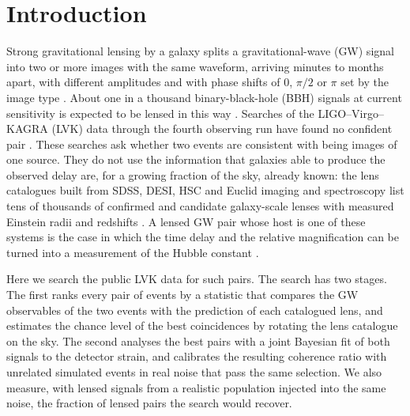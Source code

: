 \section{Introduction}
Strong gravitational lensing by a galaxy splits a gravitational-wave (GW) signal into two or more images with the same waveform, arriving minutes to months apart, with different amplitudes and with phase shifts of $0$, $\pi/2$ or $\pi$ set by the image type \citep{takahashi2003waveeffects,dai2017morse,ezquiaga2021phase}. About one in a thousand binary-black-hole (BBH) signals at current sensitivity is expected to be lensed in this way \citep{ng2018rates,oguri2018distribution,wierda2021beyond}. Searches of the LIGO--Virgo--KAGRA (LVK) data through the fourth observing run have found no confident pair \citep{hannuksela2019search,lvk2021o3a,lvk2024o3search,lvk2025gwtc4lensing}. These searches ask whether two events are consistent with being images of one source. They do not use the information that galaxies able to produce the observed delay are, for a growing fraction of the sky, already known: the lens catalogues built from SDSS, DESI, HSC and Euclid imaging and spectroscopy list tens of thousands of confirmed and candidate galaxy-scale lenses with measured Einstein radii and redshifts \citep{bolton2008slacs,sonnenfeld2018sugohi,huang2021desi,euclid2025q1lenses}. A lensed GW pair whose host is one of these systems is the case in which the time delay and the relative magnification can be turned into a measurement of the Hubble constant \citep{liao2017precision,paper1,paper2}.

Here we search the public LVK data for such pairs. The search has two stages. The first ranks every pair of events by a statistic that compares the GW observables of the two events with the prediction of each catalogued lens, and estimates the chance level of the best coincidences by rotating the lens catalogue on the sky. The second analyses the best pairs with a joint Bayesian fit of both signals to the detector strain, and calibrates the resulting coherence ratio with unrelated simulated events in real noise that pass the same selection. We also measure, with lensed signals from a realistic population injected into the same noise, the fraction of lensed pairs the search would recover.

